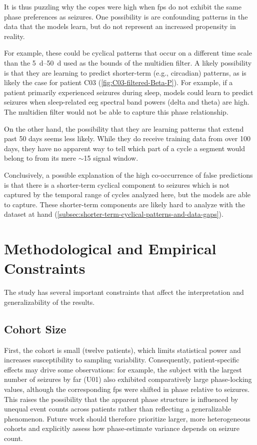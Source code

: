 It is thus puzzling why the \glspl{cope} were high when \glspl{fp} do not exhibit the same phase preferences as seizures.
One possibility is are confounding patterns in the data that the models learn, but do not represent an increased propensity in reality.

For example, these could be cyclical patterns that occur on a different time scale than the \SIrange{5}{50}{\day} used as the bounds of the multidien filter.
A likely possibility is that they are learning to predict shorter-term (e.g., circadian) patterns, as is likely the case for patient C03 (\cref{fig:C03-filtered-Beta-P}).
For example, if a patient primarily experienced seizures during sleep, models could learn to predict seizures when sleep-related \gls{eeg} spectral band powers (delta and theta) are high.
The multidien filter would not be able to capture this phase relationship.

On the other hand, the possibility that they are learning patterns that extend past 50 days seems less likely.
While they do receive training data from over 100 days, they have no apparent way to tell which part of a cycle a segment would belong to from its mere $\sim$\SI{15}{\sec} signal window.

Conclusively, a possible explanation of the high co-occurrence of false predictions is that there is a shorter-term cyclical component to seizures which is not captured by the temporal range of cycles analyzed here, but the models are able to capture.
These shorter-term components are likely hard to analyze with the dataset at hand (\cref{subsec:shorter-term-cyclical-patterns-and-data-gaps}).


\section{Methodological and Empirical Constraints}
The study has several important constraints that affect the interpretation and generalizability of the results.

\subsection{Cohort Size}
First, the cohort is small (twelve patients), which limits statistical power and increases susceptibility to sampling variability.
Consequently, patient-specific effects may drive some observations: for example, the subject with the largest number of seizures by far (U01) also exhibited comparatively large phase-locking values, although the corresponding \glspl{fp} were shifted in phase relative to seizures.
This raises the possibility that the apparent phase structure is influenced by unequal event counts across patients rather than reflecting a generalizable phenomenon.
Future work should therefore prioritize larger, more heterogeneous cohorts and explicitly assess how phase-estimate variance depends on seizure count.

